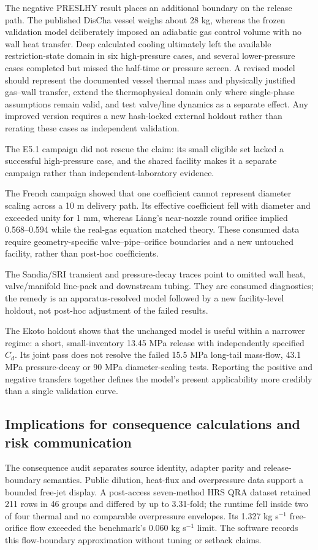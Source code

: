 \documentclass[12pt,a4paper]{article}
\begin{document}
The negative PRESLHY result places an additional boundary on the release path.
The published DisCha vessel weighs about 28 kg, whereas the frozen validation
model deliberately imposed an adiabatic gas control volume with no wall heat
transfer. Deep calculated cooling ultimately left the available restriction-state
domain in six high-pressure cases, and several lower-pressure cases completed but
missed the half-time or pressure screen. A revised model should represent the
documented vessel thermal mass and physically justified gas--wall transfer, extend
the thermophysical domain only where single-phase assumptions remain valid, and
test valve/line dynamics as a separate effect. Any improved version requires a new hash-locked external
holdout rather than rerating these cases as independent validation.

The E5.1 campaign did not rescue the claim: its small eligible set lacked a
successful high-pressure case, and the shared facility makes it a separate
campaign rather than independent-laboratory evidence.

The French campaign showed that one coefficient cannot represent diameter
scaling across a 10 m delivery path. Its effective coefficient fell with
diameter and exceeded unity for 1 mm, whereas Liang's near-nozzle round orifice
implied 0.568--0.594 while the real-gas equation matched theory. These consumed
data require geometry-specific valve--pipe--orifice boundaries and a new
untouched facility, rather than post-hoc coefficients.

The Sandia/SRI transient and pressure-decay traces point to omitted wall heat,
valve/manifold line-pack and downstream tubing. They are consumed diagnostics;
the remedy is an apparatus-resolved model followed by a new facility-level
holdout, not post-hoc adjustment of the failed results.

The Ekoto holdout shows that the unchanged model is useful within a narrower
regime: a short, small-inventory 13.45 MPa release with independently specified
$C_d$. Its joint pass does not resolve the failed 15.5 MPa long-tail mass-flow,
43.1 MPa pressure-decay or 90 MPa diameter-scaling tests. Reporting the positive
and negative transfers together defines the model's present applicability more
credibly than a single validation curve.

\subsection{Implications for consequence calculations and risk communication}
The consequence audit separates source identity, adapter parity and release-boundary
semantics. Public dilution, heat-flux and overpressure data \cite{han2013,houf2007,hyram2024}
support a bounded free-jet display. A post-access seven-method HRS QRA dataset
\cite{meneses2026qra} retained 211 rows in 46 groups and differed by up to 3.31-fold;
the runtime fell inside two of four thermal and no comparable overpressure envelopes.
Its 1.327 kg s$^{-1}$ free-orifice flow exceeded the benchmark's 0.060 kg s$^{-1}$
limit. The software records this flow-boundary approximation without tuning or setback claims.
\end{document}
